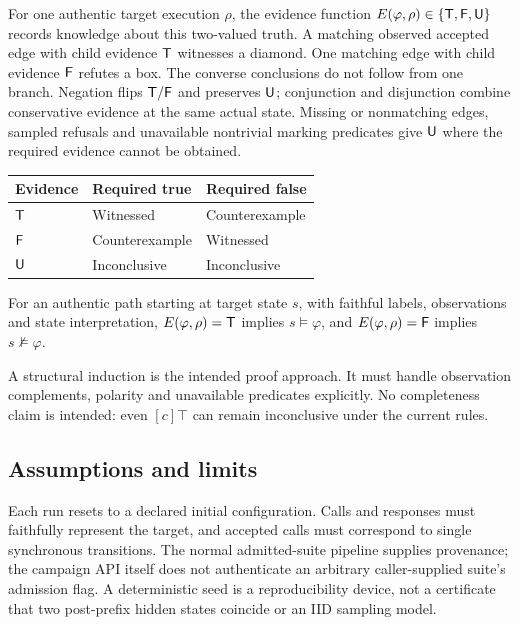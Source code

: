 For one authentic target execution $\rho$, the evidence function
$E(\varphi,\rho)\in\{\mathsf{T},\mathsf{F},\mathsf{U}\}$ records knowledge about this two-valued truth.
A matching observed accepted edge with child evidence $\mathsf{T}$ witnesses a diamond.
One matching edge with child evidence $\mathsf{F}$ refutes a box. The converse conclusions
do not follow from one branch. Negation flips $\mathsf{T}/\mathsf{F}$ and preserves $\mathsf{U}$;
conjunction and disjunction combine conservative evidence at the same actual state.
Missing or nonmatching edges, sampled refusals and unavailable nontrivial marking
predicates give $\mathsf{U}$ where the required evidence cannot be obtained.

\begin{center}
\begin{tabular}{lll}\toprule
Evidence & Required true & Required false\\\midrule
$\mathsf{T}$ & Witnessed & Counterexample\\
$\mathsf{F}$ & Counterexample & Witnessed\\
$\mathsf{U}$ & Inconclusive & Inconclusive\\\bottomrule
\end{tabular}
\end{center}

\begin{obligation}
For an authentic path starting at target state $s$, with faithful labels,
observations and state interpretation, $E(\varphi,\rho)=\mathsf{T}$ implies
$s\models\varphi$, and $E(\varphi,\rho)=\mathsf{F}$ implies $s\not\models\varphi$.
\end{obligation}
A structural induction is the intended proof approach. It must handle observation
complements, polarity and unavailable predicates explicitly. No completeness claim
is intended: even $[c]\top$ can remain inconclusive under the current rules.

\subsection{Assumptions and limits}
Each run resets to a declared initial configuration. Calls and responses must
faithfully represent the target, and accepted calls must correspond to single
synchronous transitions. The normal admitted-suite pipeline supplies provenance;
the campaign API itself does not authenticate an arbitrary caller-supplied suite's
admission flag. A deterministic seed is a reproducibility device, not a certificate
that two post-prefix hidden states coincide or an IID sampling model.

